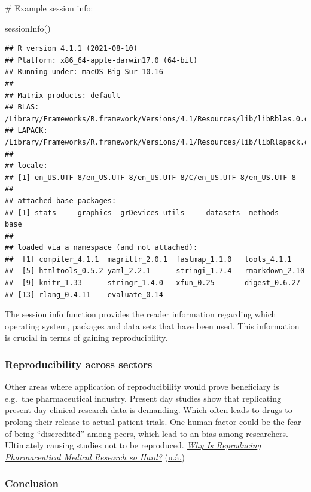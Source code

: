 \documentclass[
  12pt,
  norsk,
]{article}
\newenvironment{Shaded}{\begin{snugshade}}{\end{snugshade}}
\newcommand{\FunctionTok}[1]{\textcolor[rgb]{0.00,0.00,0.00}{#1}}
\newcommand{\NormalTok}[1]{#1}
\begin{document}
\# Example session info:

\begin{Shaded}
\begin{Highlighting}[]
\FunctionTok{sessionInfo}\NormalTok{()}
\end{Highlighting}
\end{Shaded}

\begin{verbatim}
## R version 4.1.1 (2021-08-10)
## Platform: x86_64-apple-darwin17.0 (64-bit)
## Running under: macOS Big Sur 10.16
## 
## Matrix products: default
## BLAS:   /Library/Frameworks/R.framework/Versions/4.1/Resources/lib/libRblas.0.dylib
## LAPACK: /Library/Frameworks/R.framework/Versions/4.1/Resources/lib/libRlapack.dylib
## 
## locale:
## [1] en_US.UTF-8/en_US.UTF-8/en_US.UTF-8/C/en_US.UTF-8/en_US.UTF-8
## 
## attached base packages:
## [1] stats     graphics  grDevices utils     datasets  methods   base     
## 
## loaded via a namespace (and not attached):
##  [1] compiler_4.1.1  magrittr_2.0.1  fastmap_1.1.0   tools_4.1.1    
##  [5] htmltools_0.5.2 yaml_2.2.1      stringi_1.7.4   rmarkdown_2.10 
##  [9] knitr_1.33      stringr_1.4.0   xfun_0.25       digest_0.6.27  
## [13] rlang_0.4.11    evaluate_0.14
\end{verbatim}

The session info function provides the reader information regarding
which operating system, packages and data sets that have been used. This
information is crucial in terms of gaining reproducibility.

\hypertarget{reproducibility-across-sectors}{%
\subsubsection{Reproducibility across
sectors}\label{reproducibility-across-sectors}}

Other areas where application of reproducibility would prove beneficiary
is e.g.~the pharmaceutical industry. Present day studies show that
replicating present day clinical-research data is demanding. Which often
leads to drugs to prolong their release to actual patient trials. One
human factor could be the fear of being ``discredited'' among peers,
which lead to an bias among researchers. Ultimately causing studies not
to be reproduced. \protect\hyperlink{ref-Pharm-tech}{\emph{Why Is
Reproducing Pharmaceutical Medical Research so Hard?}}
(\protect\hyperlink{ref-Pharm-tech}{u.å.})

\hypertarget{conclusion}{%
\subsubsection{\texorpdfstring{\textbf{Conclusion}}{Conclusion}}\label{conclusion}}
\end{document}
